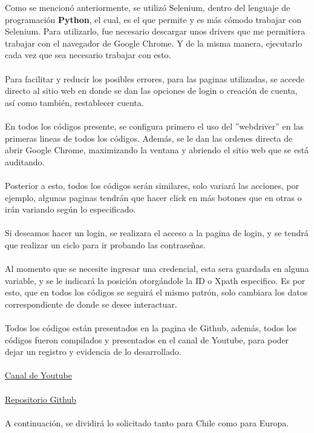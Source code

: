 \documentclass{article}
\begin{document}
Como se mencionó anteriormente, se utilizó Selenium, dentro del lenguaje de programación \textbf{Python}, el cual, es el que permite
y es más cómodo trabajar con Selenium. Para utilizarlo, fue necesario descargar unos drivers que me permitiera trabajar con el navegador
de Google Chrome. Y de la misma manera, ejecutarlo cada vez que sea necesario trabajar con esto.
\\\\
Para facilitar y reducir los posibles errores, para las paginas utilizadas, se accede directo al sitio web en donde se dan las opciones de 
login o creación de cuenta, así como también, restablecer cuenta.
\\\\
En todos los códigos presente, se configura primero el uso del ''webdriver'' en las primeras lineas de todos los códigos. Además, se le dan las ordenes directa de abrir Google Chrome, maximizando la ventana y abriendo el sitio web que se está auditando. 
\\\\
Posterior a esto, todos los códigos serán similares, solo variará las acciones, por ejemplo, algunas paginas tendrán que hacer click en más botones que en otras o irán variando según lo especificado.
\\\\
Si deseamos hacer un login, se realizara el acceso a la pagina de login, y se tendrá que realizar un ciclo para ir probando las contraseñas. 
\\\\
Al momento que se necesite ingresar una credencial, esta sera guardada en alguna variable, y se le indicará la posición otorgándole la ID o Xpath especifico. Es por esto, que en todos los códigos se seguirá el mismo patrón, solo cambiara los datos correspondiente de donde se desee interactuar.
\\\\
Todos los códigos están presentados en la pagina de Github, además, todos los códigos fueron compilados y presentados en el canal de Youtube, para poder dejar un registro y evidencia de lo desarrollado. 
\\\\
\href{https://www.youtube.com/channel/UCk5pfvIDquP594yWTGmUN7g/videos}{Canal de Youtube}\\\\
\href{https://github.com/Carro1331/Criptografia}{Repositorio Github}\\\\
A continuación, se dividirá lo solicitado tanto para Chile como para Europa.
\newpage
\end{document}
